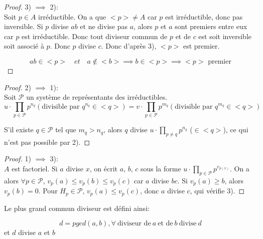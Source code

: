 \begin{proof}

	3) $\implies$ 2):\\
	Soit $p \in A$ irréductible. On a que $<p> \neq A$ car $p$ est irréductible, donc pas inversible.
	Si $p$ divise $ab$ et ne divise pas $a$, alors $p$ et $a$ sont premiers entre eux car $p$ est irréductible.
	Donc tout diviseur commun de $p$ et de $c$ est soit inversible soit associé à $p$. Donc $p$ divise $c$.
	Donc d'après 3), $<p>$ est premier.

	\[ ab \in <p>\quad  et \quad a \notin <b> \implies b \in <p> \implies <p> \text{ premier} \]

\end{proof}

\begin{proof}

	2) $\implies$ 1):\\
	Soit $\mathcal{P}$ un système de représentants des irréductibles.
	\begin{equation*}
		u \cdot \prod_{p \in \mathcal{P}} p^{n_q} (\text{divisible par } q^{n_q} \in <q> ) = v \cdot \prod_{p \in \mathcal{P}} p^{m_q} (\text{divisible par } q^{m_q} \in <q>)
	\end{equation*}
	\noindent

	S'il existe $q \in \mathcal{P}$ tel que $m_q > n_q$, alors $q$ divise $u \cdot \prod_{p \ne q} p^{n_q}$ ($\in <q>$), ce qui n'est pas possible par 2).

\end{proof}

\begin{proof}

	1) $\implies$ 3):\\
	$A$ est factoriel. Si $a$  divise $x$, on écrit $a$, $b$, $c$ sous la forme $u \cdot \prod_{p \in \mathcal{P}} p^{v_{p(x)}}$.
	On a alors $\forall p \in \mathcal{P}$, $v_p(a) \leqslant v_p(b) \leqslant v_p(c)$ car $a$ divise $bc$.
	Si $v_p(a) \geqslant b$, alors $v_p(b) = 0$.
	Pour $H_p \in \mathcal{P}$, $v_p(a) \leqslant v_p(c)$, donc $a$ divise $c$, qui vérifie 3).

\end{proof}


\begin{definition}[pgcd]
	Le plus grand commun diviseur est défini ainsi:

    $$d = pgcd (a,b), \forall \ \text{diviseur de} \ a  \ \text{et de} \ b \ \text{divise} \ d$$
	et $d$ divise $a$ et $b$
\end{definition}

